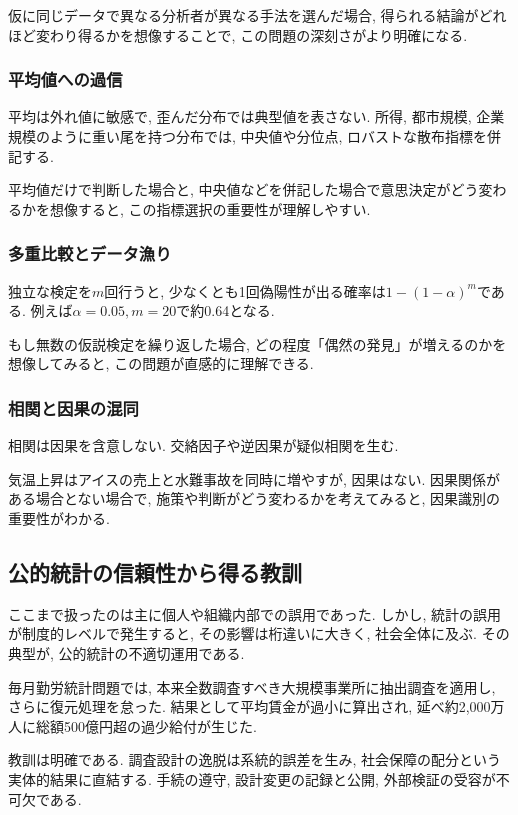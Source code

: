 仮に同じデータで異なる分析者が異なる手法を選んだ場合, 得られる結論がどれほど変わり得るかを想像することで, この問題の深刻さがより明確になる.

\subsubsection{平均値への過信}

平均は外れ値に敏感で, 歪んだ分布では典型値を表さない.  
所得, 都市規模, 企業規模のように重い尾を持つ分布では, 中央値や分位点, ロバストな散布指標を併記する.  

平均値だけで判断した場合と, 中央値などを併記した場合で意思決定がどう変わるかを想像すると, この指標選択の重要性が理解しやすい.

\subsubsection{多重比較とデータ漁り}

独立な検定を$m$回行うと, 少なくとも1回偽陽性が出る確率は$1-(1-\alpha)^m$である.  
例えば$\alpha=0.05, m=20$で約0.64となる.  

もし無数の仮説検定を繰り返した場合, どの程度「偶然の発見」が増えるのかを想像してみると, この問題が直感的に理解できる.

\subsubsection{相関と因果の混同}

相関は因果を含意しない.  
交絡因子や逆因果が疑似相関を生む.  

気温上昇はアイスの売上と水難事故を同時に増やすが, 因果はない.  
因果関係がある場合とない場合で, 施策や判断がどう変わるかを考えてみると, 因果識別の重要性がわかる.

\subsection{公的統計の信頼性から得る教訓}

ここまで扱ったのは主に個人や組織内部での誤用であった.  
しかし, 統計の誤用が制度的レベルで発生すると, その影響は桁違いに大きく, 社会全体に及ぶ.  
その典型が, 公的統計の不適切運用である.

毎月勤労統計問題では, 本来全数調査すべき大規模事業所に抽出調査を適用し, さらに復元処理を怠った.  
結果として平均賃金が過小に算出され, 延べ約2{,}000万人に総額500億円超の過少給付が生じた.  

教訓は明確である.  
調査設計の逸脱は系統的誤差を生み, 社会保障の配分という実体的結果に直結する.  
手続の遵守, 設計変更の記録と公開, 外部検証の受容が不可欠である.  


